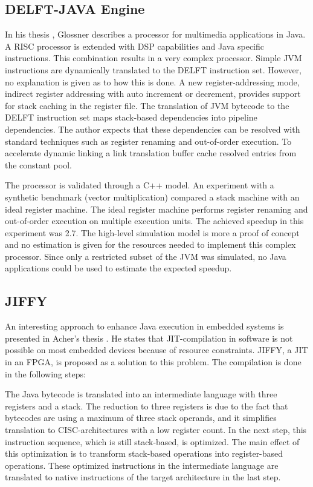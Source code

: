 \subsection{DELFT-JAVA Engine}

In his thesis \cite{DELFT}, Glossner describes a processor for
multimedia applications in Java. A RISC processor is extended with
DSP capabilities and Java specific instructions. This combination
results in a very complex processor. Simple JVM instructions are
dynamically translated to the DELFT instruction set. However, no
explanation is given as to how this is done. A new
register-addressing mode, indirect register addressing with auto
increment or decrement, provides support for stack caching in the
register file. The translation of JVM bytecode to the DELFT
instruction set maps stack-based dependencies into pipeline
dependencies. The author expects that these dependencies can be
resolved with standard techniques such as register renaming and
out-of-order execution. To accelerate dynamic linking a link
translation buffer cache resolved entries from the constant pool.


The processor is validated through a C++ model. An experiment with a
synthetic benchmark (vector multiplication) compared a stack machine
with an ideal register machine. The ideal register machine performs
register renaming and out-of-order execution on multiple execution
units. The achieved speedup in this experiment was 2.7. The
high-level simulation model is more a proof of concept and no
estimation is given for the resources needed to implement this
complex processor. Since only a restricted subset of the JVM was
simulated, no Java applications could be used to estimate the
expected speedup.


\subsection{JIFFY}

An interesting approach to enhance Java execution in embedded
systems is presented in Acher's thesis \cite{JIFFY}. He states that
JIT-compilation in software is not possible on most embedded devices
because of resource constraints. JIFFY, a JIT in an FPGA, is
proposed as a solution to this problem. The compilation is done in
the following steps:

The Java bytecode is translated into an intermediate language with
three registers and a stack. The reduction to three registers is due
to the fact that bytecodes are using a maximum of three stack
operands, and it simplifies translation to CISC-architectures with a
low register count. In the next step, this instruction sequence,
which is still stack-based, is optimized. The main effect of this
optimization is to transform stack-based operations into
register-based operations. These optimized instructions in the
intermediate language are translated to native instructions of the
target architecture in the last step.

